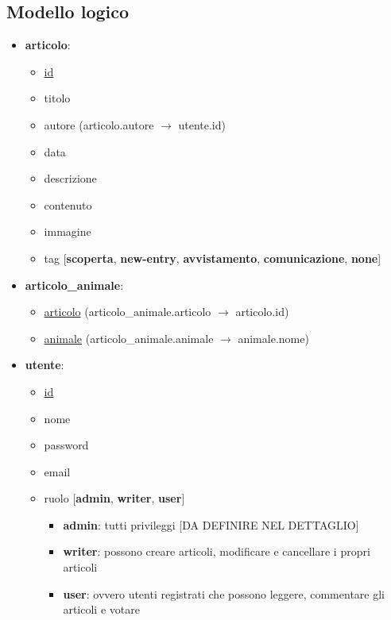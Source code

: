 \subsection{Modello logico}
    \begin{itemize}
        \item \textbf{articolo}:
        \begin{itemize}
            \item \underline{id} 
            \item titolo
            \item autore (articolo.autore $\rightarrow$ utente.id)
            \item data
            \item descrizione
            \item contenuto
            \item immagine
            \item tag [\textbf{scoperta}, \textbf{new-entry}, \textbf{avvistamento}, \textbf{comunicazione}, \textbf{none}]
        \end{itemize}

        \item \textbf{articolo\_animale}:
        \begin{itemize}
            \item \underline{articolo} (articolo\_animale.articolo $\rightarrow$ articolo.id)
            \item \underline{animale} (articolo\_animale.animale $\rightarrow$ animale.nome)
        \end{itemize}

        \item \textbf{utente}:
        \begin{itemize}
            \item \underline{id}
            \item nome
            \item password
            \item email
            \item ruolo [\textbf{admin}, \textbf{writer}, \textbf{user}]
            \begin{itemize}
                \item \textbf{admin}: tutti privileggi [DA DEFINIRE NEL DETTAGLIO]
                \item \textbf{writer}: possono creare articoli, modificare e cancellare i propri articoli
                \item \textbf{user}: ovvero utenti registrati che possono leggere, commentare gli articoli e votare
            \end{itemize}
        \end{itemize}


\end{itemize}
